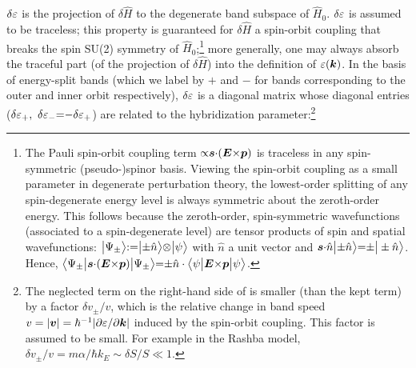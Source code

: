 \documentclass[aps, prb, showpacs, twocolumn, notitlepage, superscriptaddress]{revtex4-1}
\begin{document}
$\delta \varepsilon$ is the projection of $\delta \hat{H}$ to the degenerate band subspace of $\hat{H}_0$. $\delta \varepsilon$ is assumed to be traceless; this property is guaranteed for $\delta \hat{H}$ a spin-orbit coupling that breaks the spin SU(2) symmetry of $\hat{H}_0$;\footnote{The Pauli spin-orbit coupling term ${\propto} \boldsymbol{s}{\cdot} (\boldsymbol{E} {\times} \boldsymbol{p})$ is traceless in any spin-symmetric (pseudo-)spinor basis.  Viewing the spin-orbit coupling as a small parameter in degenerate perturbation theory, the lowest-order splitting of any spin-degenerate energy level is always symmetric about the zeroth-order energy. This follows because the zeroth-order, spin-symmetric wavefunctions (associated to a spin-degenerate level) are tensor products of spin and spatial wavefunctions: $\big|\Psi_{\pm}\big\rangle{:}{=}\big|{\pm}\hat{n}\big\rangle{\otimes} \big|\psi\big\rangle$ with $\hat{n}$ a unit vector and  $\boldsymbol{s}{\cdot} \hat{n} \big|{\pm}\hat{n}\big\rangle{=}{\pm}\big|\pm \hat{n}\big\rangle$. Hence, $\big\langle \Psi_{\pm} \big| \boldsymbol{s}{\cdot} (\boldsymbol{E} {\times} \boldsymbol{p}) \big| \Psi_{\pm} \big\rangle{=}{\pm}\hat{n}\cdot\big\langle \psi \big| \boldsymbol{E} {\times} \boldsymbol{p} \big| \psi \big\rangle$.} more generally, one may always absorb the traceful part (of  the projection of $\delta \hat{H}$) into the definition of $\varepsilon(\boldsymbol{k})$.  In the basis of energy-split bands (which we label by ${+}$ and $-$ for bands corresponding to the outer and inner orbit respectively), $\delta \varepsilon$ is a diagonal matrix whose diagonal entries ($\delta \varepsilon_+,~\delta \varepsilon_-{=}{-}\delta \varepsilon_+$)  are related to the hybridization parameter:\footnote{The neglected term on the right-hand side of  is smaller (than the kept term) by a factor $\delta v_{\pm}/v$, which is the relative change in band speed $v=|\boldsymbol{v}|=\hbar^{-1}|\partial \varepsilon/\partial \boldsymbol{k}|$ induced by the spin-orbit coupling. This factor is assumed to be small.  For example in the Rashba model, $\delta v_{\pm}/v=m\alpha/\hbar k_E{\sim}\delta S/S{\ll}1$.}   



\end{document}
